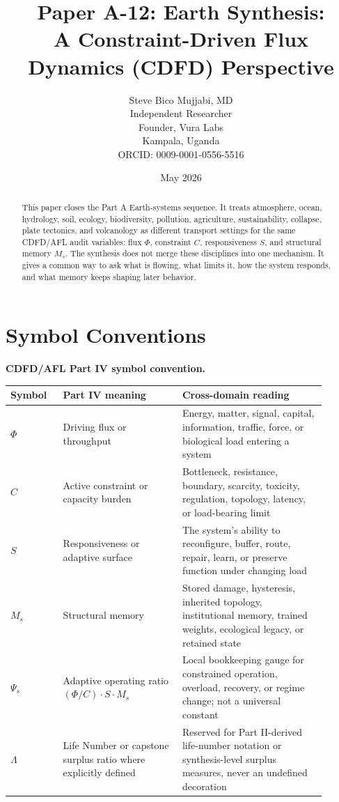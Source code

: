 \documentclass[12pt,a4paper]{article}
\title{\textbf{Paper A-12: Earth Synthesis:\\ A Constraint-Driven Flux Dynamics (CDFD) Perspective}}
\author{Steve Bico Mujjabi, MD\\
\small Independent Researcher\\
\small Founder, Vura Labs\\
\small Kampala, Uganda\\
\small ORCID: 0009-0001-0556-5516}
\date{May 2026}
\begin{document}
\maketitle

\begin{abstract}
This paper closes the Part A Earth-systems sequence. It treats atmosphere,
ocean, hydrology, soil, ecology, biodiversity, pollution, agriculture,
sustainability, collapse, plate tectonics, and volcanology as different
transport settings for the same CDFD/AFL audit variables: flux $\Phi$,
constraint $C$, responsiveness $S$, and structural memory $M_s$. The synthesis
does not merge these disciplines into one mechanism. It gives a common way to
ask what is flowing, what limits it, how the system responds, and what memory
keeps shaping later behavior.
\end{abstract}

\section*{Symbol Conventions}

\noindent\textbf{CDFD/AFL Part IV symbol convention.}
\begin{center}
{\small
\begin{tabular}{p{0.15\linewidth}p{0.34\linewidth}p{0.41\linewidth}}
\hline
Symbol & Part IV meaning & Cross-domain reading \\
\hline
$\Phi$ & Driving flux or throughput & Energy, matter, signal, capital, information, traffic, force, or biological load entering a system \\
$C$ & Active constraint or capacity burden & Bottleneck, resistance, boundary, scarcity, toxicity, regulation, topology, latency, or load-bearing limit \\
$S$ & Responsiveness or adaptive surface & The system's ability to reconfigure, buffer, route, repair, learn, or preserve function under changing load \\
$M_s$ & Structural memory & Stored damage, hysteresis, inherited topology, institutional memory, trained weights, ecological legacy, or retained state \\
$\Psi_s$ & Adaptive operating ratio $(\Phi/C)\cdot S\cdot M_s$ & Local bookkeeping gauge for constrained operation, overload, recovery, or regime change; not a universal constant \\
$\Lambda$ & Life Number or capstone surplus ratio where explicitly defined & Reserved for Part II-derived life-number notation or synthesis-level surplus measures, never an undefined decoration \\
\hline
\end{tabular}
}
\end{center}
\end{document}
